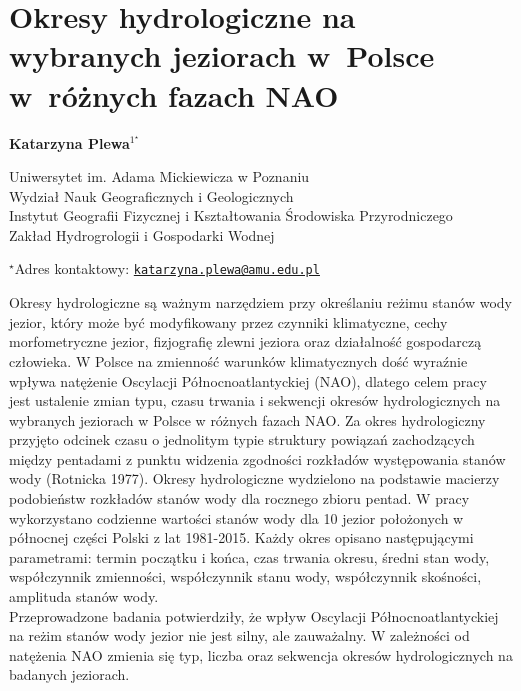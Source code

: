 \documentclass[\main/boa.tex]{subfiles}
\begin{document}
\section{Okresy hydrologiczne na wybranych jeziorach w~Polsce w~różnych fazach NAO}

\begin{center}
  {\bf {} Katarzyna Plewa$^{1^\star}$}
\end{center}

\vskip 0.3cm

\begin{affiliations}
\begin{enumerate}
\begin{minipage}{0.915\textwidth}
\centering
\item Uniwersytet im. Adama Mickiewicza w Poznaniu\\ Wydział Nauk Geograficznych i Geologicznych\\ Instytut Geografii Fizycznej i Kształtowania Środowiska Przyrodniczego \\Zakład Hydrogrologii i Gospodarki Wodnej
\end{minipage}
\end{enumerate}
$^\star$Adres kontaktowy: \href{mailto:katarzyna.plewa@amu.edu.pl}{\nolinkurl{katarzyna.plewa@amu.edu.pl}}\\
\end{affiliations}

\vskip 0.5cm


\vskip 0.5cm

Okresy hydrologiczne są ważnym narzędziem przy określaniu reżimu stanów wody jezior, który może być modyfikowany przez czynniki klimatyczne, cechy morfometryczne jezior, fizjografię zlewni jeziora oraz działalność gospodarczą człowieka. W Polsce na zmienność warunków klimatycznych dość wyraźnie wpływa natężenie Oscylacji Północnoatlantyckiej (NAO), dlatego celem pracy jest ustalenie zmian typu, czasu trwania i sekwencji okresów hydrologicznych na wybranych jeziorach w Polsce w różnych fazach NAO. Za okres hydrologiczny przyjęto odcinek czasu o jednolitym typie struktury powiązań zachodzących między pentadami z punktu widzenia zgodności rozkładów występowania stanów wody (Rotnicka 1977). Okresy hydrologiczne wydzielono na podstawie macierzy podobieństw rozkładów stanów wody dla rocznego zbioru pentad. W pracy wykorzystano codzienne wartości stanów wody dla 10 jezior położonych w północnej części Polski z lat 1981-2015. Każdy okres opisano następującymi parametrami: termin początku i końca, czas trwania okresu, średni stan wody, współczynnik zmienności, współczynnik stanu wody, współczynnik skośności, amplituda stanów wody.\\
Przeprowadzone badania potwierdziły, że wpływ Oscylacji Północnoatlantyckiej na reżim stanów wody jezior nie jest silny, ale zauważalny. W zależności od natężenia NAO zmienia się typ, liczba oraz sekwencja okresów hydrologicznych na badanych jeziorach.
\end{document}
